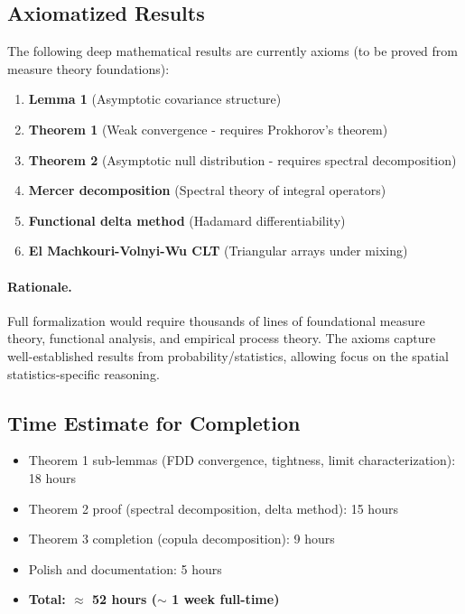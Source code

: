 \documentclass[11pt,a4paper]{article}
\theoremstyle{definition}
\begin{document}
\subsection{Axiomatized Results}

The following deep mathematical results are currently axioms (to be proved from measure theory foundations):

\begin{enumerate}
\item \textbf{Lemma 1} (Asymptotic covariance structure)
\item \textbf{Theorem 1} (Weak convergence - requires Prokhorov's theorem)
\item \textbf{Theorem 2} (Asymptotic null distribution - requires spectral decomposition)
\item \textbf{Mercer decomposition} (Spectral theory of integral operators)
\item \textbf{Functional delta method} (Hadamard differentiability)
\item \textbf{El Machkouri-Volnyi-Wu CLT} (Triangular arrays under mixing)
\end{enumerate}

\paragraph{Rationale.} Full formalization would require thousands of lines of foundational measure theory, functional analysis, and empirical process theory. The axioms capture well-established results from probability/statistics, allowing focus on the spatial statistics-specific reasoning.

\subsection{Time Estimate for Completion}

\begin{itemize}
\item Theorem 1 sub-lemmas (FDD convergence, tightness, limit characterization): 18 hours
\item Theorem 2 proof (spectral decomposition, delta method): 15 hours
\item Theorem 3 completion (copula decomposition): 9 hours
\item Polish and documentation: 5 hours
\item \textbf{Total: $\approx$ 52 hours ($\sim$ 1 week full-time)}
\end{itemize}
\end{document}
